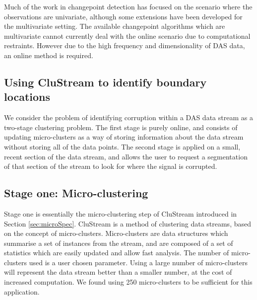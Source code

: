 Much of the work in changepoint detection has focused on the scenario where the observations are univariate, although some extensions have been developed for the multivariate setting. The available changepoint algorithms which are multivariate cannot currently deal with the online scenario due to computational restraints. However due to the high frequency and dimensionality of DAS data, an online method is required. 


\subsection{Using  CluStream to identify boundary locations}

We consider the problem of identifying corruption within a DAS data stream as a two-stage clustering problem. The first stage is purely online, and consists of updating micro-clusters as a way of storing information about the data stream without storing all of the data points.  The second stage is applied on a small, recent section of the data stream, and allows the user to request a segmentation of that section of the stream to look for where the signal is corrupted. 
\subsection{Stage one: Micro-clustering}
\label{sec:das_stage_1}

Stage one is essentially the micro-clustering step of CluStream introduced in Section \ref{sec:microSpec}.  CluStream is a method of clustering data streams, based on the concept of micro-clusters. Micro-clusters are data structures which summarise a set of instances from the stream, and are composed of a set of statistics which are easily updated and allow fast analysis.  The number of micro-clusters used is a user chosen parameter. Using a large number of micro-clusters will represent the data stream better than a smaller number, at the cost of increased computation. We found using 250 micro-clusters to be sufficient for this application. 
